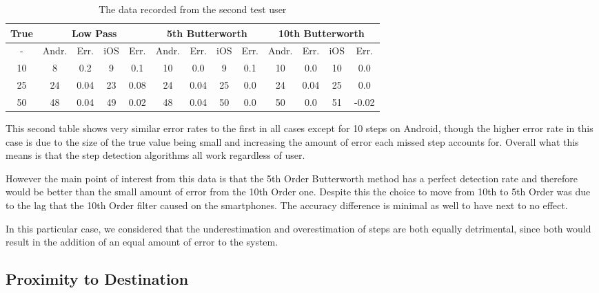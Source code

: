 \documentclass[main.tex]{subfiles}
\begin{document}
\begin{table}[ht]
	\begin{tabular}{| c || c | c | c | c | c | c | c | c | c | c | c | c |}
		\hline
		True & \multicolumn{4}{c}{Low Pass} & \multicolumn{4}{|c|}{5th Butterworth} & \multicolumn{4}{c|}{10th Butterworth} \\
		\hline
		 - & Andr. & Err. & iOS & Err. & Andr. & Err. & iOS & Err. & Andr. & Err. & iOS & Err.\\
		\hline
		10 & 8 & 0.2 & 9 & 0.1 & 10 & 0.0 & 9 & 0.1 & 10 & 0.0 & 10 & 0.0 \\ 		
		25 & 24 & 0.04 & 23 & 0.08 & 24 & 0.04 & 25 & 0.0 & 24 & 0.04 & 25 & 0.0 \\ 	
		50 & 48 & 0.04 & 49 & 0.02 & 48 & 0.04 & 50 & 0.0 & 50 & 0.0 & 51 & -0.02\\ 
		\hline	
	\end{tabular}
	\caption{The data recorded from the second test user}
\end{table}

This second table shows very similar error rates to the first in all cases except for 10 steps on Android, though the higher error rate in this case is due to the size of the true value being small and increasing the amount of error each missed step accounts for. Overall what this means is that the step detection algorithms all work regardless of user.

However the main point of interest from this data is that the 5th Order Butterworth method has a perfect detection rate and therefore would be better than the small amount of error from the 10th Order one. Despite this the choice to move from 10th to 5th Order was due to the lag that the 10th Order filter caused on the smartphones. The accuracy difference is minimal as well to have next to no effect. 

In this particular case, we considered that the underestimation and overestimation of steps are both equally detrimental, since both would result in the addition of an equal amount of error to the system.


\subsection{Proximity to Destination}
\end{document}
